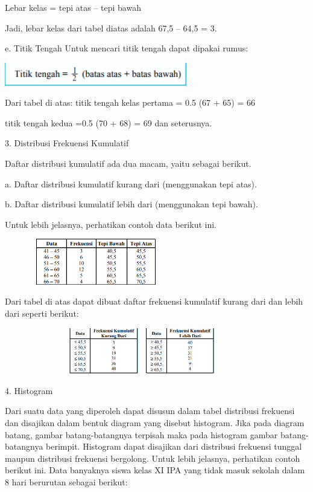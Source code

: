\documentclass[11pt,fleqn]{book} %
\begin{document}
{Lebar kelas = tepi atas – tepi bawah

Jadi, lebar kelas dari tabel diatas adalah 67,5 – 64,5 = 3.

e. Titik Tengah
Untuk mencari titik tengah dapat dipakai rumus:

\includegraphics[width = 8cm, height= 1cm]{Pictures/4reska.png}

Dari tabel di atas: titik tengah kelas pertama = 0.5 (67 + 65) = 66

titik tengah kedua =0.5 (70 + 68) = 69
 dan seterusnya.
 
 
3. Distribusi Frekuensi Kumulatif


Daftar distribusi kumulatif ada dua macam, yaitu sebagai berikut.

a. Daftar distribusi kumulatif kurang dari (menggunakan tepi atas).

b. Daftar distribusi kumulatif lebih dari (menggunakan tepi bawah).

Untuk lebih jelasnya, perhatikan contoh data berikut ini.

\includegraphics[width = 8cm, height= 2cm]{Pictures/5reska.png}

Dari tabel di atas dapat dibuat daftar frekuensi kumulatif kurang dari dan lebih
dari seperti berikut: 




\includegraphics[width = 12cm, height= 2cm]{Pictures/6reska.png}



4. Histogram


Dari suatu data yang diperoleh dapat disusun dalam tabel distribusi frekuensi dan
disajikan dalam bentuk diagram yang disebut histogram. Jika pada diagram batang,
gambar batang-batangnya terpisah maka pada histogram gambar batang-batangnya berimpit. Histogram dapat disajikan dari distribusi frekuensi tunggal maupun distribusi
frekuensi bergolong. Untuk lebih jelasnya, perhatikan contoh berikut ini.
Data banyaknya siswa kelas XI IPA yang tidak masuk sekolah dalam 8 hari berurutan
sebagai berikut: 

}
\end{document}
